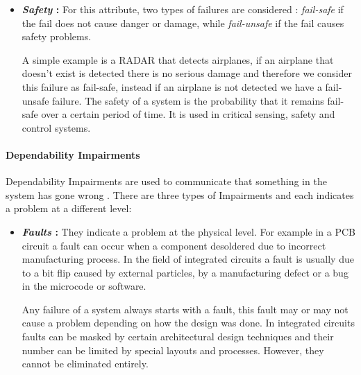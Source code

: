{{{{\begin{itemize}
					Availability is usually expressed as a percentage or by the downtime at a certain instant. For example, a system with Availability of 99.999\% will have a downtime of 5 minutes over a year. The common expression for Availability is:
					\begin{equation}
						Availability = \dfrac{MTTF}{MTTF + MTTR} = \frac{MTTF}{MTBF} 
					\end{equation}
					
					\item \textbf{\textit{Safety} : } For this attribute, two types of failures are considered : \textit{fail-safe} if the fail does not cause danger or damage, while \textit{fail-unsafe} if the fail causes safety problems.
					
					A simple example is a RADAR that detects airplanes, if an airplane that doesn't exist is detected there is no serious damage and therefore we consider this failure as fail-safe, instead if an airplane is not detected we have a fail-unsafe failure. The safety of a system is the probability that it remains fail-safe over a certain period of time. It is used in critical sensing, safety and control systems. 
				\end{itemize}	
				
			} %
			\paragraph{Dependability Impairments}{
				Dependability Impairments are used to communicate that something in the system has gone wrong . There are three types of Impairments and each indicates a problem at a different level:
				\begin{itemize}
					\item \textbf{\textit{Faults} : } They indicate a problem at the physical level. For example in a PCB circuit a fault can occur when a component desoldered due to incorrect manufacturing process. In the field of integrated circuits a fault is usually due to a bit flip caused by external particles, by a manufacturing defect or a bug in the microcode or software. 
					
					Any failure of a system always starts with a fault, this fault may or may not cause a problem depending on how the design was done. In integrated circuits faults can be masked by certain architectural design techniques and their number can be limited by special layouts and processes. However, they cannot be eliminated entirely.


\end{itemize}}}}}
